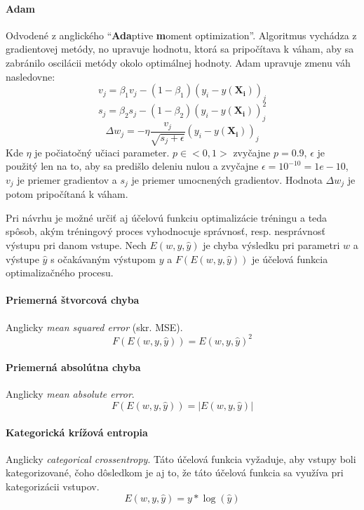 \paragraph{Adam}\cite{algo_ann_optimizer_adam}
Odvodené z anglického \enquote{\textbf{Ada}ptive \textbf{m}oment optimization}.
Algoritmus vychádza z gradientovej metódy, no upravuje hodnotu, ktorá sa pripočítava k váham, aby sa zabránilo oscilácii
metódy okolo optimálnej hodnoty.
Adam upravuje zmenu váh nasledovne:
\begin{equation}
    v_j=\beta_1{v_j}-(1-\beta_1)(y_i-y(\mathbf{X_i}))_j
\end{equation}
\begin{equation}
    s_j=\beta_2{s_j}-(1-\beta_2)(y_i-y(\mathbf{X_i}))_j^2
\end{equation}
\begin{equation}
    \Delta{w_j}=-\eta\frac{v_j}{\sqrt{s_j+\epsilon}}(y_i-y(\mathbf{X_i}))_j
\end{equation}
Kde $\eta$ je počiatočný učiaci parameter.
$p \in <0,1>$ zvyčajne $p=0.9$, $\epsilon$ je použitý len na to, aby sa predišlo deleniu nulou a zvyčajne
$\epsilon = 10^{-10} = 1e-10$, $v_j$ je priemer gradientov a $s_j$ je priemer umocnených gradientov.
Hodnota $\Delta{w_j}$ je potom pripočítaná k váham.

Pri návrhu je možné určiť aj účelovú funkciu optimalizácie tréningu a teda spôsob, akým tréningový proces vyhodnocuje
správnosť, resp. nesprávnosť výstupu pri danom vstupe.
Nech $E(w, y, \hat{y})$ je chyba výsledku pri parametri $w$ a výstupe $\hat{y}$ s očakávaným výstupom $y$
a $F(E(w, y, \hat{y}))$ je účelová funkcia optimalizačného procesu.
\paragraph{Priemerná štvorcová chyba}\cite{algo_ann_mse}
Anglicky \emph{mean squared error} (skr. MSE).
\begin{equation}
    F(E(w, y, \hat{y}))=E(w, y, \hat{y})^2
\end{equation}
\paragraph{Priemerná absolútna chyba}\cite{algo_ann_mae}
Anglicky \emph{mean absolute error}.
\begin{equation}
    F(E(w, y, \hat{y}))=|E(w, y, \hat{y})|
\end{equation}
\paragraph{Kategorická krížová entropia}\cite{algo_ann_categorical_crossentropy}
Anglicky \emph{categorical crossentropy}.
Táto účelová funkcia vyžaduje, aby vstupy boli kategorizované, čoho dôsledkom je aj to, že táto účelová funkcia sa
využíva pri kategorizácii vstupov.
\begin{equation}
    E(w, y, \hat{y})=y*\log(\hat{y})
\end{equation}

